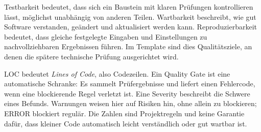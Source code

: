 \begin{beginnerstatement}

Testbarkeit bedeutet, dass sich ein Baustein mit klaren Prüfungen kontrollieren
lässt, möglichst unabhängig von anderen Teilen. Wartbarkeit beschreibt, wie
gut Software verstanden, geändert und aktualisiert werden kann.
Reproduzierbarkeit bedeutet, dass gleiche festgelegte Eingaben und
Einstellungen zu nachvollziehbaren Ergebnissen führen. Im Template sind dies
Qualitätsziele, an denen die spätere technische Prüfung ausgerichtet wird.

LOC bedeutet \emph{Lines of Code}, also Codezeilen. Ein Quality Gate ist eine
automatische Schranke: Es sammelt Prüfergebnisse und liefert einen Fehlercode,
wenn eine blockierende Regel verletzt ist. Eine Severity beschreibt die
Schwere eines Befunds. Warnungen weisen hier auf Risiken hin, ohne allein zu
blockieren; ERROR blockiert regulär. Die Zahlen sind Projektregeln und keine
Garantie dafür, dass kleiner Code automatisch leicht verständlich oder gut
wartbar ist.

\end{beginnerstatement}
